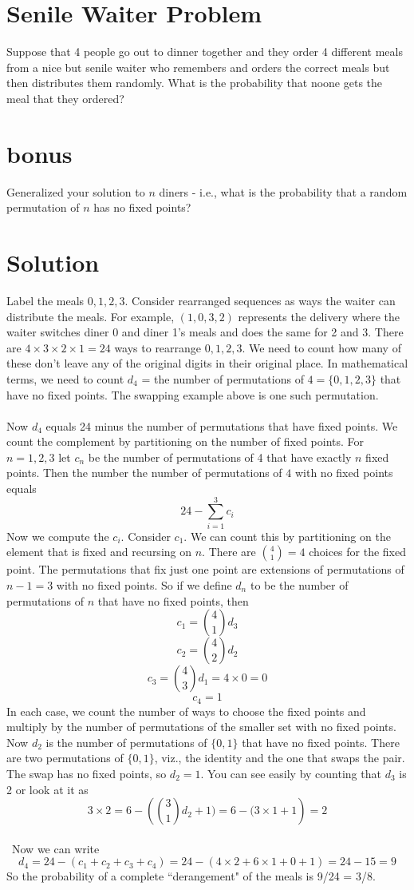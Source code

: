 \documentclass[11pt,a4paper]{report}
\theoremstyle{plain}
\theoremstyle{definition}
\theoremstyle{remark}
\begin{document}
\section*{Senile Waiter Problem}
Suppose that 4 people go out to dinner together and they order 4 different meals from a nice but senile waiter who remembers and orders the correct meals but then distributes them randomly.  What is the probability that noone gets the meal that they ordered?

\section*{bonus}
Generalized your solution to $n$ diners - i.e., what is the probability that a random permutation of $n$ has no fixed points?

\section*{Solution}
Label the meals $0,1,2,3$.  Consider rearranged sequences as ways the waiter can distribute the meals.  For example, $(1,0,3,2)$ represents the delivery where the waiter switches diner 0 and diner 1's meals and does the same for 2 and 3.  There are $4\times3\times2\times1= 24$ ways to rearrange $0,1,2,3$.  We need to count how many of these don't leave any of the original digits in their original place.  In mathematical terms, we need to count $d_4$ = the number of permutations of $4 = \{0, 1, 2, 3\}$ that have no fixed points.  The swapping example above is one such permutation. 
\\\\
Now $d_4$ equals  24 minus the number of permutations that have fixed points. We count the complement by partitioning on the number of fixed points.  For $n = 1, 2, 3$ let $c_n$ be the number of permutations of 4 that have exactly $n$ fixed points.  Then the number the number of permutations of $4$ with no fixed points equals $$ 24 - \sum_{i=1}^{3}{c_i}$$
Now we compute the $c_i$.  Consider $c_{1}$.  We can count this by partitioning on the element that is fixed and recursing on $n$.  There are $ \binom{4}{1} = 4$ choices for the fixed point.  The permutations that fix just one point are extensions of permutations of $n - 1 = 3$ with no fixed points.  So if we define $d_n$ to be the number of permutations of $n$ that have no fixed points, then 
$$c_{1} =  \binom{4}{1} d_{3}$$
$$c_{2} = \binom{4}{2} d_{2}$$
$$c_{3} = \binom{4}{3} d_{1} = 4 \times 0 = 0$$
$$c_{4} = 1$$
In each case, we count the number of ways to choose the fixed points and multiply by the number of permutations of the smaller set with no fixed points.  Now $d_{2}$ is the number of permutations of $\{0,1\}$ that have no fixed points.  There are two permutations of  $\{0,1\}$, viz., the identity and the one that swaps the pair.  The swap has no fixed points, so $d_{2} = 1$.  You can see easily by counting that $d_{3}$ is 2 or look at it as $$3\times2 =6 - ({\binom{3}{1} d_{2}+ 1) =  6 -({3} \times{1}+ 1} ) = 2$$
\\\
Now we can write $$d_4 = 24 - (c_1 + c_2 + c_3 + c_4) = 24 - (4 \times 2 + 6 \times 1 + 0 +  1) = 24 - 15 = 9$$
So the probability of a complete ``derangement" of the meals is 9/24 = 3/8.
\end{document}
